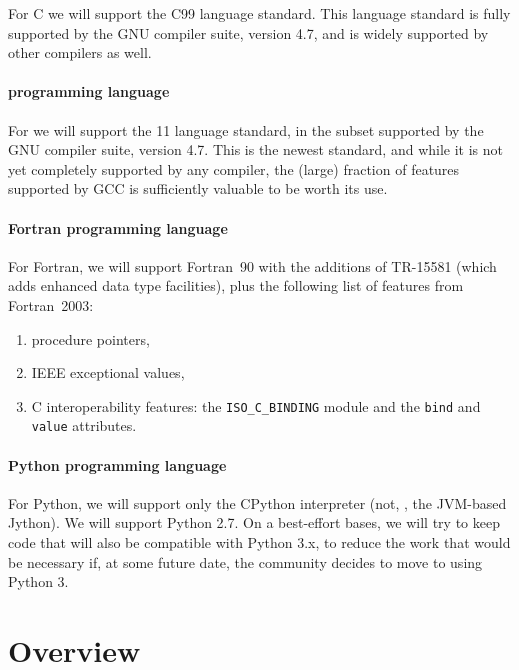 \documentclass[draftmode,draftwater]{memarticle}
\begin{document}
For C we will support the C99 language standard. This language standard
is fully supported by the GNU compiler suite, version 4.7, and is widely
supported by other compilers as well.

\subsubsection{\cpp{} programming language}

For \cpp{} we will support the \cpp{}11 language standard, in the subset
supported by the GNU compiler suite, version 4.7. This is the newest
\cpp{} standard, and while it is not yet completely supported by any
compiler, the (large) fraction of features supported by GCC is
sufficiently valuable to be worth its use.

\subsubsection{Fortran programming language}

For Fortran, we will support Fortran~90 with the additions of TR-15581
(which adds enhanced data type facilities), plus the following list of
features from Fortran~2003:
\begin{enumerate}
\item procedure pointers,
\item IEEE exceptional values,
\item C interoperability features: the \texttt{ISO\_C\_BINDING} module and
  the \texttt{bind} and \texttt{value} attributes.
\end{enumerate}

\subsubsection{Python programming language}

For Python, we will support only the CPython interpreter (not, \eg, the
JVM-based Jython). We will support Python 2.7. On a best-effort bases,
we will try to keep code that will also be compatible with Python 3.x,
to reduce the work that would be necessary if, at some future date, the
community decides to move to using Python 3.

\chapter{Overview\label{ch:overview}}
\end{document}

